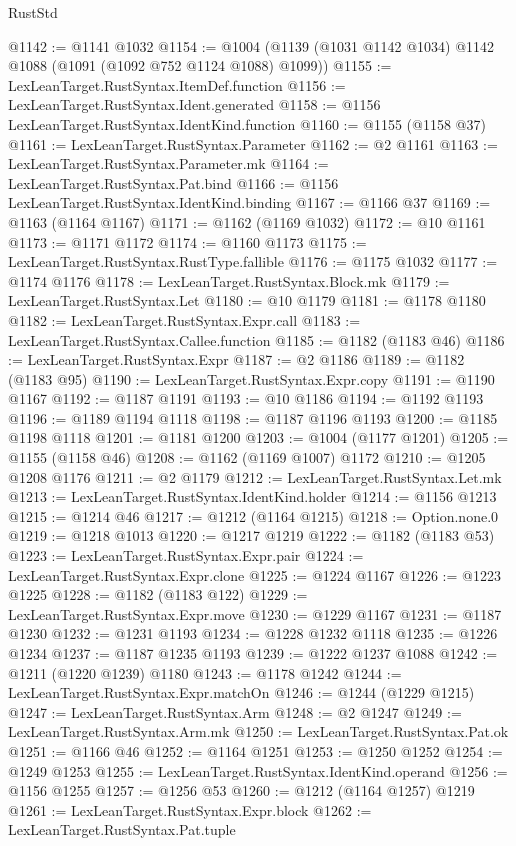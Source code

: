 \begin{lexlean}{RustStd}
\begin{coremodule}
@1142 := @1141 @1032
@1154 := @1004 (@1139 (@1031 @1142 @1034) @1142 @1088 (@1091 (@1092 @752 @1124 @1088) @1099))
@1155 := LexLeanTarget.RustSyntax.ItemDef.function
@1156 := LexLeanTarget.RustSyntax.Ident.generated
@1158 := @1156 LexLeanTarget.RustSyntax.IdentKind.function
@1160 := @1155 (@1158 @37)
@1161 := LexLeanTarget.RustSyntax.Parameter
@1162 := @2 @1161
@1163 := LexLeanTarget.RustSyntax.Parameter.mk
@1164 := LexLeanTarget.RustSyntax.Pat.bind
@1166 := @1156 LexLeanTarget.RustSyntax.IdentKind.binding
@1167 := @1166 @37
@1169 := @1163 (@1164 @1167)
@1171 := @1162 (@1169 @1032)
@1172 := @10 @1161
@1173 := @1171 @1172
@1174 := @1160 @1173
@1175 := LexLeanTarget.RustSyntax.RustType.fallible
@1176 := @1175 @1032
@1177 := @1174 @1176
@1178 := LexLeanTarget.RustSyntax.Block.mk
@1179 := LexLeanTarget.RustSyntax.Let
@1180 := @10 @1179
@1181 := @1178 @1180
@1182 := LexLeanTarget.RustSyntax.Expr.call
@1183 := LexLeanTarget.RustSyntax.Callee.function
@1185 := @1182 (@1183 @46)
@1186 := LexLeanTarget.RustSyntax.Expr
@1187 := @2 @1186
@1189 := @1182 (@1183 @95)
@1190 := LexLeanTarget.RustSyntax.Expr.copy
@1191 := @1190 @1167
@1192 := @1187 @1191
@1193 := @10 @1186
@1194 := @1192 @1193
@1196 := @1189 @1194 @1118
@1198 := @1187 @1196 @1193
@1200 := @1185 @1198 @1118
@1201 := @1181 @1200
@1203 := @1004 (@1177 @1201)
@1205 := @1155 (@1158 @46)
@1208 := @1162 (@1169 @1007) @1172
@1210 := @1205 @1208 @1176
@1211 := @2 @1179
@1212 := LexLeanTarget.RustSyntax.Let.mk
@1213 := LexLeanTarget.RustSyntax.IdentKind.holder
@1214 := @1156 @1213
@1215 := @1214 @46
@1217 := @1212 (@1164 @1215)
@1218 := Option.none.{0}
@1219 := @1218 @1013
@1220 := @1217 @1219
@1222 := @1182 (@1183 @53)
@1223 := LexLeanTarget.RustSyntax.Expr.pair
@1224 := LexLeanTarget.RustSyntax.Expr.clone
@1225 := @1224 @1167
@1226 := @1223 @1225
@1228 := @1182 (@1183 @122)
@1229 := LexLeanTarget.RustSyntax.Expr.move
@1230 := @1229 @1167
@1231 := @1187 @1230
@1232 := @1231 @1193
@1234 := @1228 @1232 @1118
@1235 := @1226 @1234
@1237 := @1187 @1235 @1193
@1239 := @1222 @1237 @1088
@1242 := @1211 (@1220 @1239) @1180
@1243 := @1178 @1242
@1244 := LexLeanTarget.RustSyntax.Expr.matchOn
@1246 := @1244 (@1229 @1215)
@1247 := LexLeanTarget.RustSyntax.Arm
@1248 := @2 @1247
@1249 := LexLeanTarget.RustSyntax.Arm.mk
@1250 := LexLeanTarget.RustSyntax.Pat.ok
@1251 := @1166 @46
@1252 := @1164 @1251
@1253 := @1250 @1252
@1254 := @1249 @1253
@1255 := LexLeanTarget.RustSyntax.IdentKind.operand
@1256 := @1156 @1255
@1257 := @1256 @53
@1260 := @1212 (@1164 @1257) @1219
@1261 := LexLeanTarget.RustSyntax.Expr.block
@1262 := LexLeanTarget.RustSyntax.Pat.tuple

\end{coremodule}
\end{lexlean}
